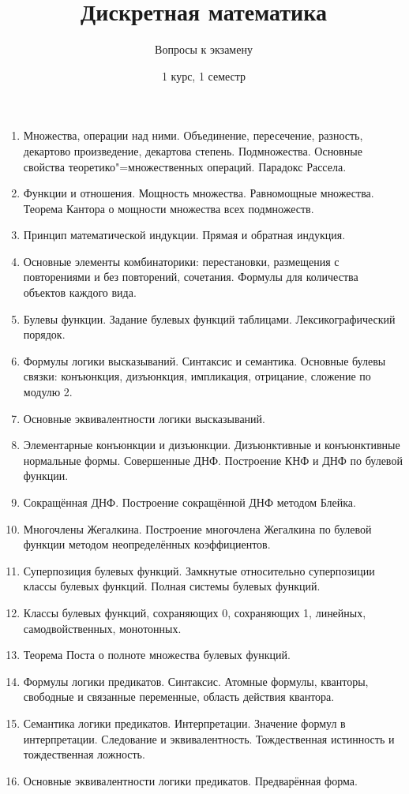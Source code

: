 \documentclass[12pt,a4paper]{article}
\begin{document}
\title{Дискретная математика}
\author{Вопросы к экзамену}
\date{1 курс, 1 семестр}
\maketitle
\thispagestyle{empty}

\begin{enumerate}

\item
Множества, операции над ними. Объединение, пересечение, разность, декартово произведение, декартова степень.
Подмножества.
Основные свойства теоретико"=множественных операций.
Парадокс Рассела.
\item
Функции и отношения. Мощность множества. Равномощные множества.
Теорема Кантора о мощности множества всех подмножеств.
\item
Принцип математической индукции. Прямая и обратная индукция.
\item
Основные элементы комбинаторики: перестановки,
размещения с повторениями и без повторений, сочетания.
Формулы для количества объектов каждого вида.
\item
Булевы функции. Задание булевых функций таблицами. Лексикографический порядок.
\item
Формулы логики высказываний. Синтаксис и семантика.
Основные булевы связки: конъюнкция, дизъюнкция, импликация, отрицание, сложение по модулю 2.
\item
Основные эквивалентности логики высказываний.
\item
Элементарные конъюнкции и дизъюнкции.
Дизъюнктивные и конъюнктивные нормальные формы. Совершенные ДНФ.
Построение КНФ и ДНФ по булевой функции.
\item
Сокращённая ДНФ. Построение сокращённой ДНФ методом Блейка.
\item
Многочлены Жегалкина.
Построение многочлена Жегалкина по булевой функции методом неопределённых коэффициентов.
\item
Суперпозиция булевых функций. Замкнутые относительно
суперпозиции классы булевых функций. Полная системы булевых функций.
\item
Классы булевых функций, сохраняющих 0, сохраняющих 1, линейных, самодвойственных, монотонных.
\item
Теорема Поста о полноте множества булевых функций.
\item
Формулы логики предикатов. Синтаксис.
Атомные формулы, кванторы, свободные и связанные переменные, область действия квантора.
\item
Семантика логики предикатов. Интерпретации.
Значение формул в интерпретации. Следование и эквивалентность.
Тождественная истинность и тождественная ложность.
\item
Основные эквивалентности логики предикатов. Предварённая форма.
\end{enumerate}
\end{document}
